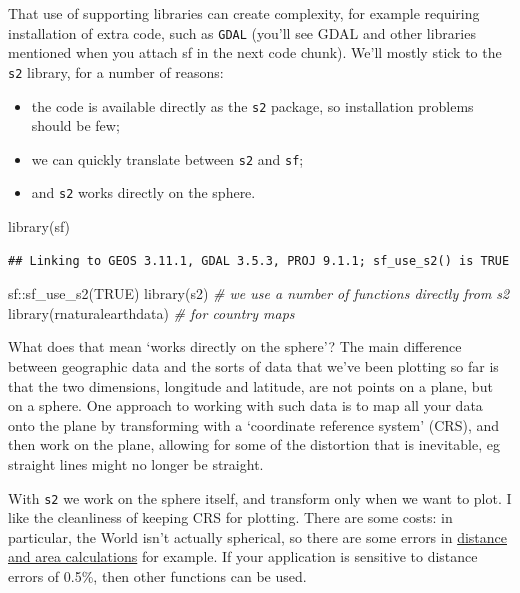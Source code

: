 \documentclass[
]{book}
\newenvironment{Shaded}{\begin{snugshade}}{\end{snugshade}}
\newcommand{\CommentTok}[1]{\textcolor[rgb]{0.56,0.35,0.01}{\textit{#1}}}
\newcommand{\ConstantTok}[1]{\textcolor[rgb]{0.00,0.00,0.00}{#1}}
\newcommand{\FunctionTok}[1]{\textcolor[rgb]{0.00,0.00,0.00}{#1}}
\newcommand{\NormalTok}[1]{#1}
\newcommand{\SpecialCharTok}[1]{\textcolor[rgb]{0.00,0.00,0.00}{#1}}
\providecommand{\tightlist}{%
  \setlength{\itemsep}{0pt}\setlength{\parskip}{0pt}}
\begin{document}
That use of supporting libraries can create complexity, for example requiring installation of extra code, such as \texttt{GDAL} (you'll see GDAL and other libraries mentioned when you attach sf in the next code chunk). We'll mostly stick to the \texttt{s2} library, for a number of reasons:

\begin{itemize}
\tightlist
\item
  the code is available directly as the \texttt{s2} package, so installation problems should be few;
\item
  we can quickly translate between \texttt{s2} and \texttt{sf};
\item
  and \texttt{s2} works directly on the sphere.
\end{itemize}

\begin{Shaded}
\begin{Highlighting}[]
\FunctionTok{library}\NormalTok{(sf)}
\end{Highlighting}
\end{Shaded}

\begin{verbatim}
## Linking to GEOS 3.11.1, GDAL 3.5.3, PROJ 9.1.1; sf_use_s2() is TRUE
\end{verbatim}

\begin{Shaded}
\begin{Highlighting}[]
\NormalTok{sf}\SpecialCharTok{::}\FunctionTok{sf\_use\_s2}\NormalTok{(}\ConstantTok{TRUE}\NormalTok{) }
\FunctionTok{library}\NormalTok{(s2) }\CommentTok{\# we use a number of functions directly from s2}
\FunctionTok{library}\NormalTok{(rnaturalearthdata) }\CommentTok{\# for country maps}
\end{Highlighting}
\end{Shaded}

What does that mean `works directly on the sphere'? The main difference between geographic data and the sorts of data that we've been plotting so far is that the two dimensions, longitude and latitude, are not points on a plane, but on a sphere. One approach to working with such data is to map all your data onto the plane by transforming with a `coordinate reference system' (CRS), and then work on the plane, allowing for some of the distortion that is inevitable, eg straight lines might no longer be straight.

With \texttt{s2} we work on the sphere itself, and transform only when we want to plot. I like the cleanliness of keeping CRS for plotting. There are some costs: in particular, the World isn't actually spherical, so there are some errors in \href{https://r-spatial.github.io/sf/articles/sf7.html\#measures}{distance and area calculations} for example. If your application is sensitive to distance errors of 0.5\%, then other functions can be used.
\end{document}
